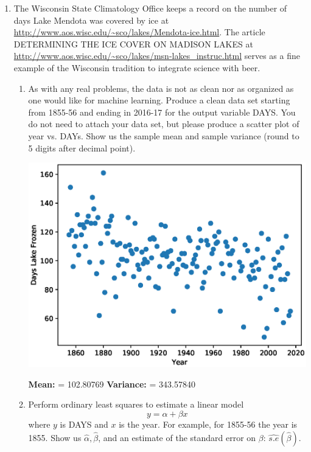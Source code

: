 \documentclass{article}
\begin{document}
\begin{enumerate}


\item 
The Wisconsin State Climatology Office keeps a record on 
the number of days Lake Mendota was covered by ice at
\url{http://www.aos.wisc.edu/~sco/lakes/Mendota-ice.html}.
The article DETERMINING THE ICE COVER ON MADISON LAKES at
\url{http://www.aos.wisc.edu/~sco/lakes/msn-lakes_instruc.html}
serves as a fine example of the Wisconsin tradition to integrate science with beer.

\begin{enumerate}
\item
As with any real problems, the data is not as clean nor as organized as one would like for machine learning.
Produce a clean data set starting from 1855-56 and ending in 2016-17 for the output variable DAYS.
You do not need to attach your data set, but please produce a scatter plot of year vs. DAYs.
Show us the sample mean and sample variance (round to 5 digits after decimal point).

\hspace*{-4cm}  
\includegraphics[scale=1]{ice_scatter}

\color{red}
\textbf{Mean:} = 102.80769  
\textbf{Variance:} = 343.57840
\color{black}
\item 
Perform ordinary least squares to estimate a linear model 
$$y = \alpha + \beta x$$
where $y$ is DAYS and $x$ is the year.
For example, for 1855-56 the year is 1855.
Show us $\hat{\alpha}, \hat{\beta}$, and an estimate of the standard error on $\beta$: $\widehat{s.e}(\hat{\beta})$.


\end{enumerate}
\end{enumerate}
\end{document}
